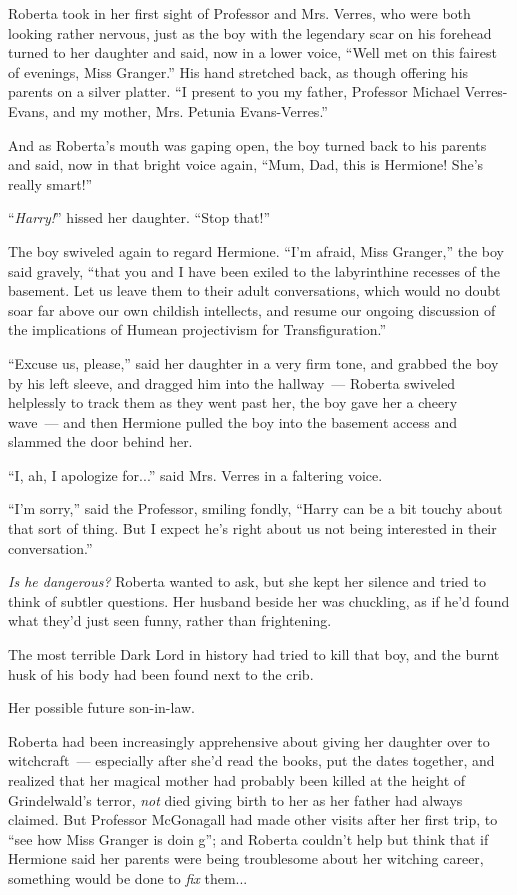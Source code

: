 Roberta took in her first sight of Professor and Mrs. Verres, who were both looking rather nervous, just as the boy with the legendary scar on his forehead turned to her daughter and said, now in a lower voice, ``Well met on this fairest of evenings, Miss Granger.'' His hand stretched back, as though offering his parents on a silver platter. ``I present to you my father, Professor Michael Verres-Evans, and my mother, Mrs. Petunia Evans-Verres.''

And as Roberta's mouth was gaping open, the boy turned back to his parents and said, now in that bright voice again, ``Mum, Dad, this is Hermione! She's really smart!''

``\emph{Harry!}'' hissed her daughter. ``Stop that!''

The boy swiveled again to regard Hermione. ``I'm afraid, Miss Granger,'' the boy said gravely, ``that you and I have been exiled to the labyrinthine recesses of the basement. Let us leave them to their adult conversations, which would no doubt soar far above our own childish intellects, and resume our ongoing discussion of the implications of Humean projectivism for Transfiguration.''

``Excuse us, please,'' said her daughter in a very firm tone, and grabbed the boy by his left sleeve, and dragged him into the hallway~--- Roberta swiveled helplessly to track them as they went past her, the boy gave her a cheery wave~--- and then Hermione pulled the boy into the basement access and slammed the door behind her.

``I, ah, I apologize for...'' said Mrs. Verres in a faltering voice.

``I'm sorry,'' said the Professor, smiling fondly, ``Harry can be a bit touchy about that sort of thing. But I expect he's right about us not being interested in their conversation.''

\emph{Is he dangerous?} Roberta wanted to ask, but she kept her silence and tried to think of subtler questions. Her husband beside her was chuckling, as if he'd found what they'd just seen funny, rather than frightening.

The most terrible Dark Lord in history had tried to kill that boy, and the burnt husk of his body had been found next to the crib.

Her possible future son-in-law.

Roberta had been increasingly apprehensive about giving her daughter over to witchcraft~--- especially after she'd read the books, put the dates together, and realized that her magical mother had probably been killed at the height of Grindelwald's terror, \emph{not} died giving birth to her as her father had always claimed. But Professor McGonagall had made other visits after her first trip, to ``see how Miss Granger is doin g''; and Roberta couldn't help but think that if Hermione said her parents were being troublesome about her witching career, something would be done to \emph{fix} them...

